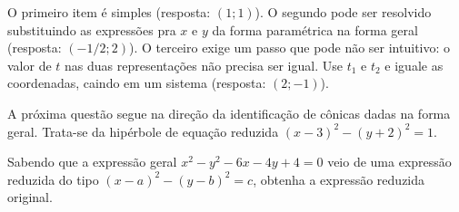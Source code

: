 \documentclass[main_estudante.tex]{subfiles}
\begin{document}
O primeiro item é simples (resposta: $(1;1)$). O segundo pode ser resolvido substituindo as expressões pra $x$ e $y$ da forma paramétrica na forma geral (resposta: $(-1/2;2)$). O terceiro exige um passo que pode não ser intuitivo: o valor de $t$ nas duas representações não precisa ser igual. Use $t_1$ e $t_2$ e iguale as coordenadas, caindo em um sistema (resposta: $(2;-1)$).

A próxima questão segue na direção da identificação de cônicas dadas na forma geral. Trata-se da hipérbole de equação reduzida $(x-3)^2-(y+2)^2=1$.

\begin{questao}
Sabendo que a expressão geral $x^2-y^2-6x-4y+4=0$ veio de uma expressão reduzida do tipo $(x-a)^2-(y-b)^2=c$, obtenha a expressão reduzida original.
\end{questao}
\end{document}
